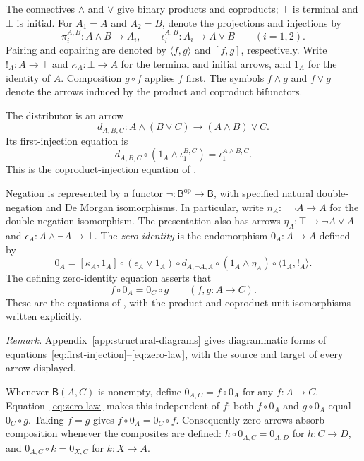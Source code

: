 \documentclass[11pt]{article}
\newcommand{\B}{\mathsf B}
\begin{document}
The connectives $\wedge$ and $\vee$ give binary products and coproducts;
$\top$ is terminal and $\bot$ is initial. For $A_1=A$ and $A_2=B$,
denote the projections and injections by
\[
 \pi_i^{A,B}:A\wedge B\longrightarrow A_i,
 \qquad
 \iota_i^{A,B}:A_i\longrightarrow A\vee B
 \qquad(i=1,2).
\]
Pairing and copairing are denoted
by $\langle f,g\rangle$ and $[f,g]$, respectively. Write
$!_A:A\to\top$ and $\kappa_A:\bot\to A$ for the terminal and initial
arrows, and $1_A$ for the identity of $A$. Composition $g\circ f$
applies $f$ first. The symbols $f\wedge g$ and $f\vee g$ denote the
arrows induced by the product and coproduct bifunctors.

The distributor is an arrow
\[
 d_{A,B,C}:A\wedge(B\vee C)\longrightarrow(A\wedge B)\vee C.
\]
Its first-injection equation is
\begin{equation}
 d_{A,B,C}\circ(1_A\wedge\iota_1^{B,C})
   =\iota_1^{A\wedge B,C}.
 \label{eq:first-injection}
\end{equation}
This is the coproduct-injection equation of
\cite[\S11.1, p.~234]{DP}.

Negation is represented by a functor
$\neg:\B^{\mathrm{op}}\to\B$, with specified natural
double-negation and De Morgan isomorphisms. In particular, write
$n_A:\neg\neg A\to A$ for the double-negation isomorphism.
The presentation also has arrows
$\eta_A:\top\to\neg A\vee A$ and
$\epsilon_A:A\wedge\neg A\to\bot$.
The \emph{zero identity} is the endomorphism $0_A:A\to A$ defined by
\begin{equation}
 0_A=[\kappa_A,1_A]\circ(\epsilon_A\vee1_A)\circ d_{A,\neg A,A}
     \circ(1_A\wedge\eta_A)\circ\langle1_A,!_A\rangle.
 \label{eq:zero-identity}
\end{equation}
The defining zero-identity equation asserts that
\begin{equation}
 f\circ0_A=0_C\circ g
 \qquad(f,g:A\to C).
 \label{eq:zero-law}
\end{equation}
These are the equations of \cite[\S14.2, p.~317]{DP}, with the
product and coproduct unit isomorphisms written explicitly.

\noindent\textit{Remark.}
Appendix~\ref{app:structural-diagrams} gives diagrammatic forms of
equations~\eqref{eq:first-injection}--\eqref{eq:zero-law}, with the
source and target of every arrow displayed.

Whenever $\B(A,C)$ is nonempty, define $0_{A,C}=f\circ0_A$ for any
$f:A\to C$. Equation~\eqref{eq:zero-law} makes this independent of
$f$: both $f\circ0_A$ and $g\circ0_A$ equal $0_C\circ g$.
Taking $f=g$ gives $f\circ0_A=0_C\circ f$. Consequently zero arrows
absorb composition whenever the composites are defined:
$h\circ0_{A,C}=0_{A,D}$ for $h:C\to D$, and
$0_{A,C}\circ k=0_{X,C}$ for $k:X\to A$.
\end{document}

